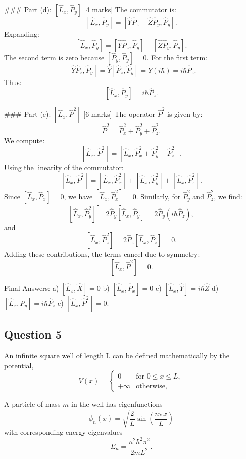 \documentclass{article}
\begin{document}
### Part (d): \(\left[\hat{L}_x, \hat{P}_y\right]\) [4 marks]
The commutator is:
\[
\left[\hat{L}_x, \hat{P}_y\right] = \left[\hat{Y}\hat{P}_z - \hat{Z}\hat{P}_y, \hat{P}_y\right].
\]
Expanding:
\[
\left[\hat{L}_x, \hat{P}_y\right] = \left[\hat{Y}\hat{P}_z, \hat{P}_y\right] - \left[\hat{Z}\hat{P}_y, \hat{P}_y\right].
\]
The second term is zero because \(\left[\hat{P}_y, \hat{P}_y\right] = 0\). For the first term:
\[
\left[\hat{Y}\hat{P}_z, \hat{P}_y\right] = \hat{Y}\left[\hat{P}_z, \hat{P}_y\right] = \hat{Y}(i\hbar) = i\hbar\hat{P}_z.
\]
Thus:
\[
\left[\hat{L}_x, \hat{P}_y\right] = i\hbar\hat{P}_z.
\]

### Part (e): \(\left[\hat{L}_x, \hat{P}^2\right]\) [6 marks]
The operator \(\hat{P}^2\) is given by:
\[
\hat{P}^2 = \hat{P}_x^2 + \hat{P}_y^2 + \hat{P}_z^2.
\]
We compute:
\[
\left[\hat{L}_x, \hat{P}^2\right] = \left[\hat{L}_x, \hat{P}_x^2 + \hat{P}_y^2 + \hat{P}_z^2\right].
\]
Using the linearity of the commutator:
\[
\left[\hat{L}_x, \hat{P}^2\right] = \left[\hat{L}_x, \hat{P}_x^2\right] + \left[\hat{L}_x, \hat{P}_y^2\right] + \left[\hat{L}_x, \hat{P}_z^2\right].
\]
Since \(\left[\hat{L}_x, \hat{P}_x\right] = 0\), we have \(\left[\hat{L}_x, \hat{P}_x^2\right] = 0\). Similarly, for \(\hat{P}_y^2\) and \(\hat{P}_z^2\), we find:
\[
\left[\hat{L}_x, \hat{P}_y^2\right] = 2\hat{P}_y\left[\hat{L}_x, \hat{P}_y\right] = 2\hat{P}_y(i\hbar\hat{P}_z),
\]
and
\[
\left[\hat{L}_x, \hat{P}_z^2\right] = 2\hat{P}_z\left[\hat{L}_x, \hat{P}_z\right] = 0.
\]
Adding these contributions, the terms cancel due to symmetry:
\[
\left[\hat{L}_x, \hat{P}^2\right] = 0.
\]

Final Answers:
a) \(\left[\hat{L}_x, \hat{X}\right] = 0\)  
b) \(\left[\hat{L}_x, \hat{P}_x\right] = 0\)  
c) \(\left[\hat{L}_x, \hat{Y}\right] = i\hbar\hat{Z}\)  
d) \(\left[\hat{L}_x, \hat{P}_y\right] = i\hbar\hat{P}_z\)  
e) \(\left[\hat{L}_x, \hat{P}^2\right] = 0\).


\subsection{Question 5}
An infinite square well of length L can be defined mathematically by the potential,
\[
V(x) = 
\begin{cases} 
0 & \text{for } 0 \leq x \leq L, \\
+\infty & \text{otherwise},
\end{cases}
\]

A particle of mass \(m\) in the well has eigenfunctions
\[
\phi_n(x) = \sqrt{\frac{2}{L}} \sin\left(\frac{n \pi x}{L}\right)
\]
with corresponding energy eigenvalues
\[
E_n = \frac{n^2 \hbar^2 \pi^2}{2mL^2}.
\]
\end{document}
